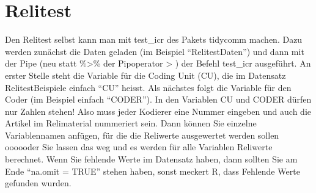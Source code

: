 \documentclass[twoside, pagesize, fontsize=11pt, dvipsnames]{scrreport}
\begin{document}
\hypertarget{relitest-1}{%
\section{Relitest}\label{relitest-1}}

Den Relitest selbst kann man mit test\_icr des Pakets tidycomm machen.
Dazu werden zunächst die Daten geladen (im Beispiel
\enquote{RelitestDaten}) und dann mit der Pipe (neu statt
\%\textgreater\% der Pipoperator \textbar\textgreater{} ) der Befehl
test\_icr ausgeführt. An erster Stelle steht die Variable für die Coding
Unit (CU), die im Datensatz RelitestBeispiele einfach \enquote{CU}
heisst. Als nächstes folgt die Variable für den Coder (im Beispiel
einfach \enquote{CODER}). In den Variablen CU und CODER dürfen nur
Zahlen stehen! Also muss jeder Kodierer eine Nummer eingeben und auch
die Artikel im Relimaterial nummeriert sein. Dann können Sie einzelne
Variablennamen anfügen, für die die Reliwerte ausgewertet werden sollen
oooooder Sie lassen das weg und es werden für alle Variablen Reliwerte
berechnet. Wenn Sie fehlende Werte im Datensatz haben, dann sollten Sie
am Ende \enquote{na.omit = TRUE} stehen haben, sonst meckert R, dass
Fehlende Werte gefunden wurden.
\end{document}
